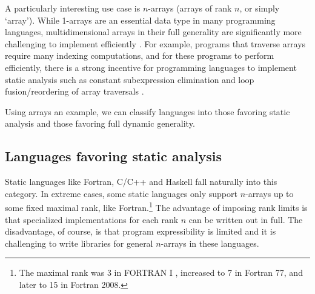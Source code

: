 \documentclass[preprint]{sigplanconf}
\newcommand\julialetter[1]{{\strut\fontfamily{cmss}\bfseries\selectfont{#1}}}
\DeclareRobustCommand\Julia{%
\begin{tikzpicture}[baseline=0mm, every node/.style={inner sep=0mm, outer sep=0mm}]
\node[anchor=base]        (j) at (0,0) {\julialetter{\j}};
\node[anchor=base, right=0ex of j] (u) {\julialetter{u}};
\node[anchor=base, right=0ex of u] (l) {\julialetter{l}};
\node[anchor=base, right=0ex of l] (i) {\julialetter{\i}};
\node[anchor=base, right=0ex of i] (a) {\julialetter{a}};
\path let \p1 = (j) in node[juliadot={mylightblue,mydarkblue}] (bluedot) at (\x1+0.02ex,1.4ex) {};
\path let \p1 = (i) in node[juliadot={mylightred,mydarkred}] (reddot) at (\x1,1.4ex) {};
\path let \p1 = (reddot) in node[juliadot={mylightpurple,mydarkpurple}] (purpledot) at (\x1+0.5ex,\y1) {};
\path let \p1 = (reddot) in node[juliadot={mylightgreen,mydarkgreen}] (greendot) at (\x1+0.25ex,\y1+0.42ex) {};
\end{tikzpicture}%
}
\begin{document}


A particularly interesting use case is $n$-arrays (arrays of rank $n$, or
simply `array'). While 1-arrays are an essential data type in many programming
languages, multidimensional arrays in their full generality are significantly
more challenging to implement efficiently \cite{Sattley:1960as,
Sattley:1961as, Randell:1964a6}. For example, programs that traverse arrays
require many indexing computations, and for these programs to perform
efficiently, there is a strong incentive for programming languages to
implement static analysis such as constant subexpression elimination and loop
fusion/reordering of array traversals \cite{Busam:1969oe}.

Using arrays an example, we can classify languages into those favoring
static analysis and those favoring full dynamic generality.

%

\subsection{Languages favoring static analysis}

Static languages like Fortran, C/C++ and Haskell fall naturally into this
category. In extreme cases, some static languages only support $n$-arrays up
to some fixed maximal rank, like Fortran.\footnote{The maximal rank was 3 in
FORTRAN I \cite{Backus:1957fa}, increased to 7 in Fortran 77, and later to 15
in Fortran 2008.} The advantage of imposing rank limits is that specialized
implementations for each rank $n$ can be written out in full. The
disadvantage, of course, is that program expressibility is limited and it is
challenging to write libraries for general $n$-arrays in these languages.
\end{document}
